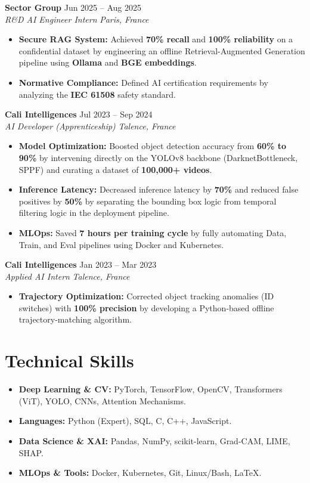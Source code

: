 \documentclass[10pt, letterpaper]{article}
\newcommand{\entry}[4]{
  \noindent \textbf{#1} \hfill #2 \\
  \textit{#3} \hfill \textit{#4} \par 
}
\begin{document}
\vspace{6pt}

\entry{Sector Group}{Jun 2025 -- Aug 2025}{R\&D AI Engineer Intern}{Paris, France}
\begin{itemize}
    \item \textbf{Secure RAG System:} Achieved \textbf{70\% recall} and \textbf{100\% reliability} on a confidential dataset by engineering an offline Retrieval-Augmented Generation pipeline using \textbf{Ollama} and \textbf{BGE embeddings}.
    \item \textbf{Normative Compliance:} Defined AI certification requirements by analyzing the \textbf{IEC 61508} safety standard.
\end{itemize}

\vspace{6pt}

\entry{Cali Intelligences}{Jul 2023 -- Sep 2024}{AI Developer (Apprenticeship)}{Talence, France}
\begin{itemize}
    \item \textbf{Model Optimization:} Boosted object detection accuracy from \textbf{60\% to 90\%} by intervening directly on the YOLOv8 backbone (DarknetBottleneck, SPPF) and curating a dataset of \textbf{100,000+ videos}.
    \item \textbf{Inference Latency:} Decreased inference latency by \textbf{70\%} and reduced false positives by \textbf{50\%} by separating the bounding box logic from temporal filtering logic in the deployment pipeline.
    \item \textbf{MLOps:} Saved \textbf{7 hours per training cycle} by fully automating Data, Train, and Eval pipelines using Docker and Kubernetes.
\end{itemize}

\vspace{6pt}

\entry{Cali Intelligences}{Jan 2023 -- Mar 2023}{Applied AI Intern}{Talence, France}
\begin{itemize}
    \item \textbf{Trajectory Optimization:} Corrected object tracking anomalies (ID switches) with \textbf{100\% precision} by developing a Python-based offline trajectory-matching algorithm.
\end{itemize}

\section{Technical Skills}
\begin{itemize}
    \item \textbf{Deep Learning \& CV:} PyTorch, TensorFlow, OpenCV, Transformers (ViT), YOLO, CNNs, Attention Mechanisms.
    \item \textbf{Languages:} Python (Expert), SQL, C, C++, JavaScript.
    \item \textbf{Data Science \& XAI:} Pandas, NumPy, scikit-learn, Grad-CAM, LIME, SHAP.
    \item \textbf{MLOps \& Tools:} Docker, Kubernetes, Git, Linux/Bash, LaTeX.
\end{itemize}
\end{document}
